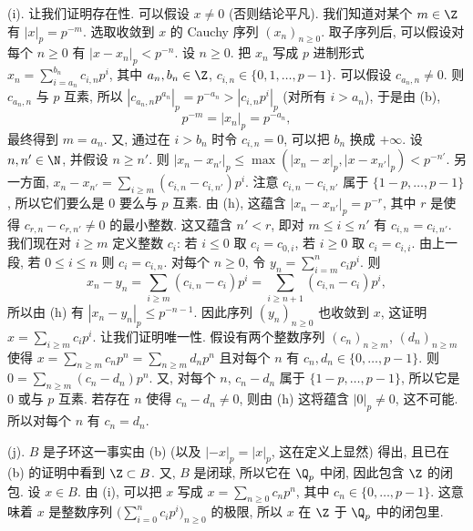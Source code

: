 \begin{solution}
(i). 让我们证明存在性. 可以假设 $x \neq 0$ (否则结论平凡). 我们知道对某个 $m \in \Z$ 有 $|x|_p = p^{-m}$. 选取收敛到 $x$ 的 Cauchy 序列 $(x_n)_{n \geq 0}$. 取子序列后, 可以假设对每个 $n \geq 0$ 有 $|x - x_n|_p < p^{-n}$.
设 $n \geq 0$. 把 $x_n$ 写成 $p$ 进制形式 $x_n = \sum_{i=a_n}^{b_n}c_{i,n}p^i$, 其中 $a_n, b_n \in \Z$, $c_{i,n} \in \{0, 1, \ldots, p-1\}$. 可以假设 $c_{a_n,n} \neq 0$. 则 $c_{a_n,n}$ 与 $p$ 互素, 所以 $|c_{a_n,n}p^{a_n}|_p = p^{-a_n} > |c_{i,n}p^i|_p$ (对所有 $i > a_n$), 于是由 (b),
\[
p^{-m} = |x_n|_p = p^{-a_n},
\]
最终得到 $m = a_n$.
又, 通过在 $i > b_n$ 时令 $c_{i,n} = 0$, 可以把 $b_n$ 换成 $+\infty$.
设 $n, n' \in \N$, 并假设 $n \geq n'$. 则 $|x_n - x_{n'}|_p \leq \max(|x_n - x|_p, |x - x_{n'}|_p) < p^{-n'}$. 另一方面, $x_n - x_{n'} = \sum_{i \geq m}(c_{i,n} - c_{i,n'})p^i$. 注意 $c_{i,n} - c_{i,n'}$ 属于 $\{1 - p, \ldots, p - 1\}$, 所以它们要么是 $0$ 要么与 $p$ 互素. 由 (h), 这蕴含 $|x_n - x_{n'}|_p = p^{-r}$, 其中 $r$ 是使得 $c_{r,n} - c_{r,n'} \neq 0$ 的最小整数. 这又蕴含 $n' < r$, 即对 $m \leq i \leq n'$ 有 $c_{i,n} = c_{i,n'}$.
我们现在对 $i \geq m$ 定义整数 $c_i$: 若 $i \leq 0$ 取 $c_i = c_{0,i}$, 若 $i \geq 0$ 取 $c_i = c_{i,i}$. 由上一段, 若 $0 \leq i \leq n$ 则 $c_i = c_{i,n}$. 对每个 $n \geq 0$, 令 $y_n = \sum_{i=m}^n c_ip^i$. 则
\[
x_n - y_n = \sum_{i \geq m}(c_{i,n} - c_i)p^i = \sum_{i \geq n+1}(c_{i,n} - c_i)p^i,
\]
所以由 (h) 有 $|x_n - y_n|_p \leq p^{-n-1}$. 因此序列 $(y_n)_{n \geq 0}$ 也收敛到 $x$, 这证明 $x = \sum_{i \geq m}c_ip^i$.
让我们证明唯一性. 假设有两个整数序列 $(c_n)_{n \geq m}$, $(d_n)_{n \geq m}$ 使得 $x = \sum_{n \geq m}c_np^n = \sum_{n \geq m}d_np^n$ 且对每个 $n$ 有 $c_n, d_n \in \{0, \ldots, p-1\}$. 则 $0 = \sum_{n \geq m}(c_n - d_n)p^n$. 又, 对每个 $n$, $c_n - d_n$ 属于 $\{1 - p, \ldots, p - 1\}$, 所以它是 $0$ 或与 $p$ 互素. 若存在 $n$ 使得 $c_n - d_n \neq 0$, 则由 (h) 这将蕴含 $|0|_p \neq 0$, 这不可能. 所以对每个 $n$ 有 $c_n = d_n$.

(j). $B$ 是子环这一事实由 (b) (以及 $|-x|_p = |x|_p$, 这在定义上显然) 得出, 且已在 (b) 的证明中看到 $\Z \subset B$. 又, $B$ 是闭球, 所以它在 $\Q_p$ 中闭, 因此包含 $\Z$ 的闭包.
设 $x \in B$. 由 (i), 可以把 $x$ 写成 $x = \sum_{n \geq 0}c_np^n$, 其中 $c_n \in \{0, \ldots, p-1\}$. 这意味着 $x$ 是整数序列 $\bigl(\sum_{i=0}^n c_ip^i\bigr)_{n \geq 0}$ 的极限, 所以 $x$ 在 $\Z$ 于 $\Q_p$ 中的闭包里.


\end{solution}
